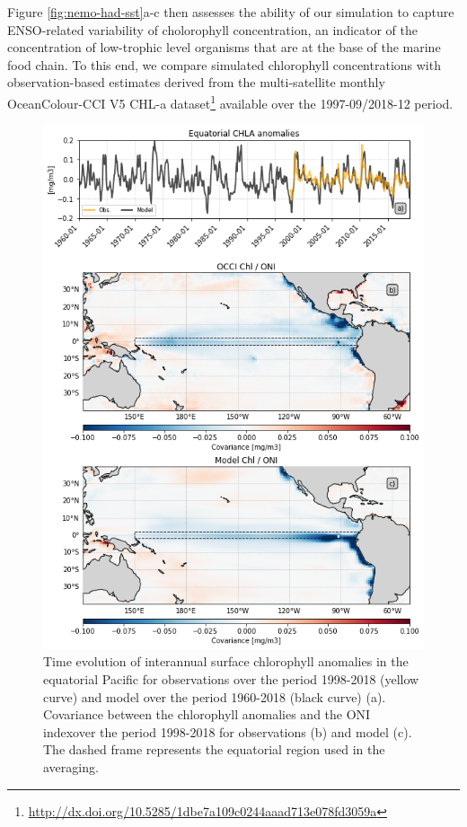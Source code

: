Figure \ref{fig:nemo-had-sst}a-c then assesses the ability of our simulation to capture ENSO-related variability of cholorophyll concentration, an indicator of the concentration of low-trophic level organisms that are at the base of the marine food chain. To this end, we compare simulated chlorophyll concentrations with observation-based estimates derived from the multi-satellite monthly OceanColour-CCI V5 CHL-a dataset\footnote{\url{http://dx.doi.org/10.5285/1dbe7a109c0244aaad713e078fd3059a}} \citep{sathyendranathOceanColourTimeSeries2019} available over the 1997-09/2018-12 period. 

\begin{figure}[h!tp]
	\centering
	\includegraphics[scale=0.4]{figs/fig2.png}
	\caption{Time evolution of interannual surface chlorophyll anomalies in the equatorial Pacific for observations over the period 1998-2018 (yellow curve) and  model over the period 1960-2018 (black curve) (a). Covariance between the chlorophyll anomalies and the ONI indexover the period 1998-2018 for observations (b) and model (c). The dashed frame represents the equatorial region used in the averaging.}
	\label{fig:nemo-sat-chl}
\end{figure}

